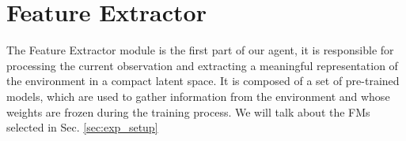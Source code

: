





\section{Feature Extractor} \label{sec:feature_extractor}
The Feature Extractor module is the first part of our agent, it is responsible for processing the current observation and extracting a meaningful representation of the environment in a compact latent space.
It is composed of a set of pre-trained models, which are used to gather information from the environment and whose weights are frozen during the training process.
We will talk about the FMs selected in Sec. \ref{sec:exp_setup}

